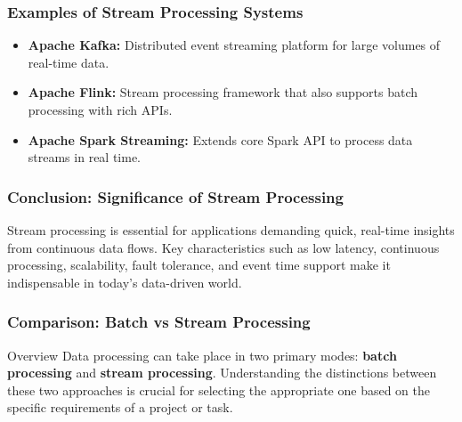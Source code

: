 \documentclass{beamer}
\begin{document}
\begin{frame}[fragile]
    \frametitle{Examples of Stream Processing Systems}
    \begin{itemize}
        \item \textbf{Apache Kafka:} Distributed event streaming platform for large volumes of real-time data.
        \item \textbf{Apache Flink:} Stream processing framework that also supports batch processing with rich APIs.
        \item \textbf{Apache Spark Streaming:} Extends core Spark API to process data streams in real time.
    \end{itemize}
\end{frame}

\begin{frame}[fragile]
    \frametitle{Conclusion: Significance of Stream Processing}
    Stream processing is essential for applications demanding quick, real-time insights from continuous data flows. Key characteristics such as low latency, continuous processing, scalability, fault tolerance, and event time support make it indispensable in today's data-driven world.
\end{frame}

\begin{frame}[fragile]
    \frametitle{Comparison: Batch vs Stream Processing}
    \begin{block}{Overview}
        Data processing can take place in two primary modes: \textbf{batch processing} and \textbf{stream processing}. Understanding the distinctions between these two approaches is crucial for selecting the appropriate one based on the specific requirements of a project or task.
    \end{block}
\end{frame}
\end{document}
